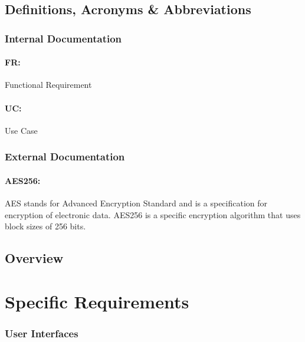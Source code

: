 \documentclass[11pt]{article}
\begin{document}
\subsection{Definitions, Acronyms \& Abbreviations}
\subsubsection{Internal Documentation}
\paragraph{FR:} Functional Requirement
\paragraph{UC:} Use Case
\subsubsection{External Documentation}
\paragraph{AES256:} AES stands for Advanced Encryption Standard and is a specification for encryption of electronic data. AES256 is a specific encryption algorithm that uses block sizes of 256 bits.
\subsection{Overview}

\section{Specific Requirements}
\subsubsection{User Interfaces}

\end{document}
